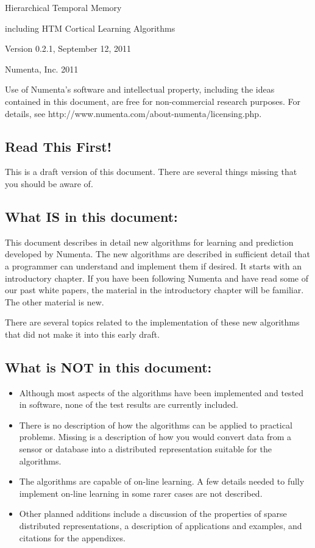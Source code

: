 \documentclass{report}
\newlength{\drop}
\newcommand*{\titleHTMCLA}{\begingroup%
\drop=0.08\textheight
\vspace*{\drop}
\begin{center}
{\Huge Hierarchical Temporal Memory\par}
{\Large including HTM Cortical Learning Algorithms\par}
\vfill
{\Large Version 0.2.1, September 12, 2011\par}
{\Large \textcopyright{} Numenta, Inc. 2011\par}
\end{center}
\vfill
\endgroup}
\begin{document}
\lstset{language=Python}        %



\pagestyle{empty}
\titleHTMCLA

Use of Numenta's software and intellectual property, including the
ideas contained in this document, are free for non-commercial research
purposes. For details, see
http://www.numenta.com/about-numenta/licensing.php.

\clearpage

\subsection*{Read This First!}

This is a draft version of this document. There are several things
missing that you should be aware of.

\subsection*{What IS in this document:}
This document describes in detail new algorithms for learning and
prediction developed by Numenta. The new algorithms are described in
sufficient detail that a programmer can understand and implement them
if desired. It starts with an introductory chapter. If you have been
following Numenta and have read some of our past white papers, the
material in the introductory chapter will be familiar. The other
material is new.

There are several topics related to the implementation of these new
algorithms that did not make it into this early draft.

\subsection*{What is NOT in this document:}

\begin{itemize}

\item Although most aspects of the algorithms have been implemented
and tested in software, none of the test results are currently
included.

\item There is no description of how the algorithms can be applied to
practical problems. Missing is a description of how you would convert
data from a sensor or database into a distributed representation
suitable for the algorithms.

\item The algorithms are capable of on-line learning. A few details
needed to fully implement on-line learning in some rarer cases are not
described.

\item Other planned additions include a discussion of the properties
of sparse distributed representations, a description of applications
and examples, and citations for the appendixes.
\end{itemize}
\end{document}
